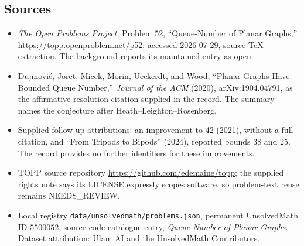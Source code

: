 \documentclass[11pt]{article}
\begin{document}
\subsection{Sources}
\begin{itemize}
\item \emph{The Open Problems Project}, Problem 52, ``Queue-Number of Planar Graphs,'' \url{https://topp.openproblem.net/p52}; accessed 2026-07-29, source-TeX extraction. The background reports its maintained entry as open.
\item Dujmović, Joret, Micek, Morin, Ueckerdt, and Wood, ``Planar Graphs Have Bounded Queue Number,'' \emph{Journal of the ACM} (2020), arXiv:1904.04791, as the affirmative-resolution citation supplied in the record. The summary names the conjecture after Heath--Leighton--Rosenberg.
\item Supplied follow-up attributions: an improvement to 42 (2021), without a full citation, and ``From Tripods to Bipods'' (2024), reported bounds 38 and 25. The record provides no further identifiers for these improvements.
\item TOPP source repository \url{https://github.com/edemaine/topp}; the supplied rights note says its LICENSE expressly scopes software, so problem-text reuse remains NEEDS\_REVIEW.
\item Local registry \texttt{data/unsolvedmath/problems.json}, permanent UnsolvedMath ID $5500052$, source code catalogue entry, \emph{Queue-Number of Planar Graphs}. Dataset attribution: Ulam AI and the UnsolvedMath Contributors.
\end{itemize}
\end{document}

